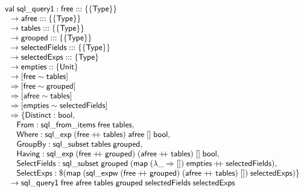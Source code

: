 \documentclass{article}
\newcommand{\mt}[1]{\mathsf{#1}}
\newcommand{\rc}{+ \hspace{-.075in} + \;}
\begin{document}
$$\begin{array}{l}
  \mt{val} \; \mt{sql\_query1} : \mt{free} ::: \{\{\mt{Type}\}\} \\
  \hspace{.1in} \to \mt{afree} ::: \{\{\mt{Type}\}\} \\
  \hspace{.1in} \to \mt{tables} ::: \{\{\mt{Type}\}\} \\
  \hspace{.1in} \to \mt{grouped} ::: \{\{\mt{Type}\}\} \\
  \hspace{.1in} \to \mt{selectedFields} ::: \{\{\mt{Type}\}\} \\
  \hspace{.1in} \to \mt{selectedExps} ::: \{\mt{Type}\} \\
  \hspace{.1in} \to \mt{empties} :: \{\mt{Unit}\} \\
  \hspace{.1in} \to [\mt{free} \sim \mt{tables}] \\
  \hspace{.1in} \Rightarrow [\mt{free} \sim \mt{grouped}] \\
  \hspace{.1in} \Rightarrow [\mt{afree} \sim \mt{tables}] \\
  \hspace{.1in} \Rightarrow [\mt{empties} \sim \mt{selectedFields}] \\
  \hspace{.1in} \Rightarrow \{\mt{Distinct} : \mt{bool}, \\
  \hspace{.2in} \mt{From} : \mt{sql\_from\_items} \; \mt{free} \; \mt{tables}, \\
  \hspace{.2in} \mt{Where} : \mt{sql\_exp} \; (\mt{free} \rc \mt{tables}) \; \mt{afree} \; [] \; \mt{bool}, \\
  \hspace{.2in} \mt{GroupBy} : \mt{sql\_subset} \; \mt{tables} \; \mt{grouped}, \\
  \hspace{.2in} \mt{Having} : \mt{sql\_exp} \; (\mt{free} \rc \mt{grouped}) \; (\mt{afree} \rc \mt{tables}) \; [] \; \mt{bool}, \\
  \hspace{.2in} \mt{SelectFields} : \mt{sql\_subset} \; \mt{grouped} \; (\mt{map} \; (\lambda \_ \Rightarrow []) \; \mt{empties} \rc \mt{selectedFields}), \\
  \hspace{.2in} \mt {SelectExps} : \$(\mt{map} \; (\mt{sql\_expw} \; (\mt{free} \rc \mt{grouped}) \; (\mt{afree} \rc \mt{tables}) \; []) \; \mt{selectedExps}) \} \\
  \hspace{.1in} \to \mt{sql\_query1} \; \mt{free} \; \mt{afree} \; \mt{tables} \; \mt{grouped} \; \mt{selectedFields} \; \mt{selectedExps}
\end{array}$$
\end{document}
